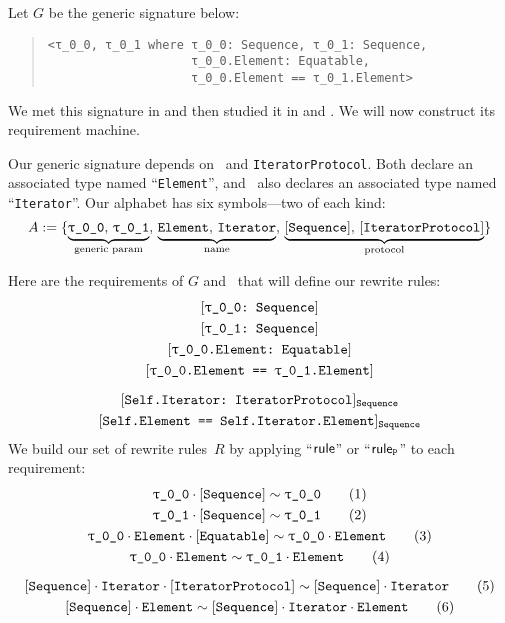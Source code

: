 \documentclass[../generics]{subfiles}
\begin{document}
\begin{example}\label{rqm first example}
Let $G$ be the generic signature below:
\begin{quote}
\begin{verbatim}
<τ_0_0, τ_0_1 where τ_0_0: Sequence, τ_0_1: Sequence,
                    τ_0_0.Element: Equatable,
                    τ_0_0.Element == τ_0_1.Element>
\end{verbatim}
\end{quote}
We met this signature in  and then studied it in  and . We will now construct its requirement machine.

Our generic signature depends on \tSequence\ and \texttt{IteratorProtocol}. Both declare an associated type named ``\texttt{Element}'', and \tSequence\ also declares an associated type named ``\texttt{Iterator}''. Our alphabet has six symbols---two of each kind:
\[ A := \{ \underbrace{\mathstrut\rT,\, \rU}_{\text{generic param}},\, \underbrace{\mathstrut\nElement,\, \nIterator}_{\text{name}},\, \underbrace{\mathstrut\pSequence,\, \pIterator}_{\text{protocol}} \} \]

Here are the requirements of $G$ and \tSequence\ that will define our rewrite rules:
\begin{gather*}
\rTSequence\\
\rUSequence\\
\ConfReq{\rT.Element}{Equatable}\\
\SameReq{\rT.Element}{\rU.Element}\\[\medskipamount]
\AssocConfReq{Self.Iterator}{IteratorProtocol}{Sequence}\\
\AssocSameReq{Self.Element}{Self.Iterator.Element}{Sequence}
\end{gather*}
We build our set of rewrite rules~$R$ by applying ``$\mathsf{rule}$'' or ``$\mathsf{rule}_{\texttt{P}}$'' to each requirement:
\begin{gather*}
\ConfRule{\rT}{\pSequence} \tag{1} \\
\ConfRule{\rU}{\pSequence} \tag{2} \\
\ConfRule{\rT\cdot\nElement}{\protosym{Equatable}} \tag{3} \\
\SameRule{\rT\cdot\nElement}{\rU\cdot\nElement}\tag{4} \\[\medskipamount]
\ConfRule{\pSequence\cdot\nIterator}{\pIterator} \tag{5} \\
\SameRule{\pSequence\cdot\nElement}{\pSequence\cdot\nIterator\cdot\nElement} \tag{6}
\end{gather*}


\end{example}
\end{document}
